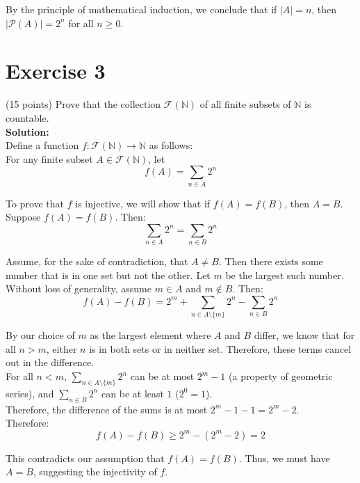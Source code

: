 \documentclass{article}
\begin{document}
By the principle of mathematical induction, we conclude that if $|A| = n$, then $|\mathcal{P}(A)| = 2^n$ for all $n \geq 0$.

\newpage

\section*{Exercise 3}
(15 points) Prove that the collection $\mathcal{F}(\mathbb{N})$ of all finite subsets of $\mathbb{N}$ is countable. \\

\textbf{Solution:} \\

Define a function $f: \mathcal{F}(\mathbb{N}) \rightarrow \mathbb{N}$ as follows: \\

For any finite subset $A \in \mathcal{F}(\mathbb{N})$, let
\[f(A) = \sum_{n \in A} 2^n\]

To prove that $f$ is injective, we will show that if $f(A) = f(B)$, then $A = B$. \\

Suppose $f(A) = f(B)$. Then:
\[\sum_{n \in A} 2^n = \sum_{n \in B} 2^n\]

Assume, for the sake of contradiction, that $A \neq B$. Then there exists some number that is in one set but not the other. Let $m$ be the largest such number. \\

Without loss of generality, assume $m \in A$ and $m \notin B$. Then:
\[f(A) - f(B) = 2^m + \sum_{n \in A \setminus \{m\}} 2^n - \sum_{n \in B} 2^n\]

By our choice of $m$ as the largest element where $A$ and $B$ differ, we know that for all $n > m$, either $n$ is in both sets or in neither set. Therefore, these terms cancel out in the difference. \\

For all $n < m$, $\sum_{n \in A \setminus \{m\}} 2^n$ can be at most $2^m - 1$ (a property of geometric series), and $\sum_{n \in B} 2^n$ can be at least $1$ ($2^0 = 1$). \\

Therefore, the difference of the sums is at most $2^m - 1 - 1 = 2^m - 2$. \\

Therefore:
\[f(A) - f(B) \geq 2^m - (2^m - 2) = 2\]

This contradicts our assumption that $f(A) = f(B)$. Thus, we must have $A = B$, suggesting the injectivity of $f$. \\
\end{document}
